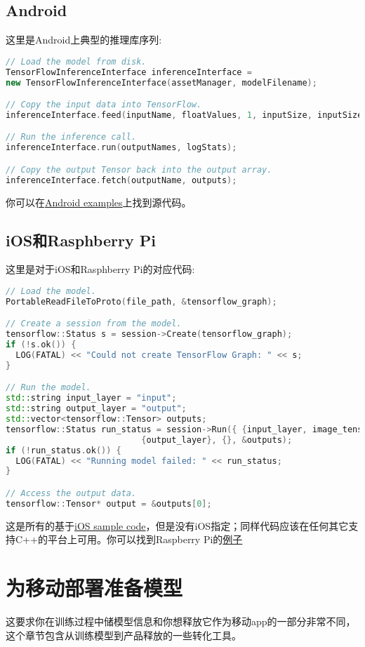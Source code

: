 \subsection{Android}
这里是Android上典型的推理库序列:
\begin{lstlisting}[language=C++]
// Load the model from disk.
TensorFlowInferenceInterface inferenceInterface =
new TensorFlowInferenceInterface(assetManager, modelFilename);

// Copy the input data into TensorFlow.
inferenceInterface.feed(inputName, floatValues, 1, inputSize, inputSize, 3);

// Run the inference call.
inferenceInterface.run(outputNames, logStats);

// Copy the output Tensor back into the output array.
inferenceInterface.fetch(outputName, outputs);
\end{lstlisting}
你可以在\href{https://github.com/tensorflow/tensorflow/blob/master/tensorflow/examples/android/src/org/tensorflow/demo/TensorFlowImageClassifier.java#L107}{Android examples}上找到源代码。
\subsection{iOS和Rasphberry Pi}
这里是对于iOS和Rasphberry Pi的对应代码:
\begin{lstlisting}[language=C++]
// Load the model.
PortableReadFileToProto(file_path, &tensorflow_graph);

// Create a session from the model.
tensorflow::Status s = session->Create(tensorflow_graph);
if (!s.ok()) {
  LOG(FATAL) << "Could not create TensorFlow Graph: " << s;
}

// Run the model.
std::string input_layer = "input";
std::string output_layer = "output";
std::vector<tensorflow::Tensor> outputs;
tensorflow::Status run_status = session->Run({ {input_layer, image_tensor}},
                           {output_layer}, {}, &outputs);
if (!run_status.ok()) {
  LOG(FATAL) << "Running model failed: " << run_status;
}

// Access the output data.
tensorflow::Tensor* output = &outputs[0];
\end{lstlisting}
这是所有的基于\href{https://www.github.com/tensorflow/tensorflow/blob/r1.4/tensorflow/examples/ios/simple/RunModelViewController.mm}{iOS sample code}，但是没有iOS指定；同样代码应该在任何其它支持C++的平台上可用。你可以找到Raspberry Pi的\href{https://github.com/tensorflow/tensorflow/blob/master/tensorflow/contrib/pi_examples/label_image/label_image.cc}{例子}
\section{为移动部署准备模型}
这要求你在训练过程中储模型信息和你想释放它作为移动app的一部分非常不同，这个章节包含从训练模型到产品释放的一些转化工具。
